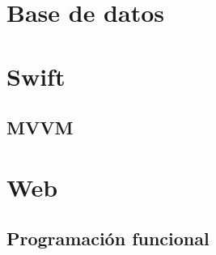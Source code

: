 \section{Base de datos}

\section{Swift}

\subsection{MVVM}

\section{Web}

\subsection{Programación funcional}